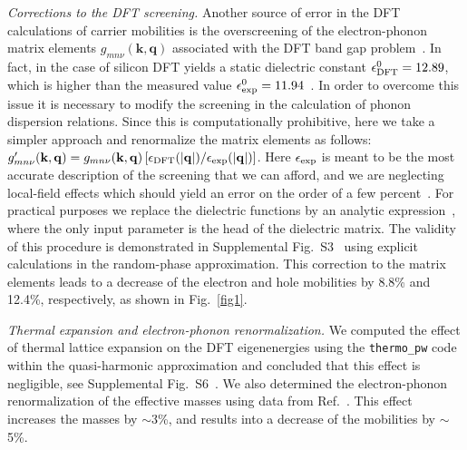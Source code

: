 \documentclass[aps,prl,twocolumn,superscriptaddress]{revtex4-1}
\begin{document}
{\it Corrections to the DFT screening.}
Another source of error in the DFT calculations of carrier mobilities is the overscreening of the
electron-phonon matrix elements $g_{mn\nu}(\mathbf{k,q})$ associated with the DFT band gap problem~\cite{Giustino2017}.
In fact, in the case of silicon DFT yields a static dielectric 
constant $\epsilon_{\rm DFT}^0 = 12.89$, which is higher than the measured value 
$\epsilon_{\rm exp}^0 = 11.94$~\cite{Sze2007}. In order to overcome this issue it is 
necessary to modify the screening in the calculation of phonon dispersion relations. Since this is 
computationally prohibitive, here we take a simpler approach and renormalize the matrix 
elements as follows: $g^\prime_{mn\nu}(\mathbf{k,q}) = g_{mn\nu}(\mathbf{k,q}) 
\left[\epsilon_{\rm DFT}(|{\bf q}|)/ \epsilon_{\rm exp}(|{\bf q}|)\right]$.
Here $\epsilon_{\rm exp}$ is meant to be the most accurate description of the screening that we can afford,
and we are neglecting local-field effects which should yield an error on the order of a few percent~\cite{Hybertsen1987}. 
For practical purposes we replace the 
dielectric functions by an analytic expression~\cite{Resta1977}, where the only input parameter is the head of
the dielectric matrix. The validity of this procedure
is demonstrated in Supplemental Fig.~S3~\cite{SI} using explicit
calculations in the random-phase approximation. This correction to the matrix elements leads
to a decrease of the electron and hole mobilities by 8.8\% and
12.4\%, respectively, as shown in Fig.~\ref{fig1}.

{\it Thermal expansion and electron-phonon renormalization.} We computed the effect of 
thermal lattice expansion on the DFT eigenenergies using the \texttt{thermo\_pw} code~\cite{thermopw} within the quasi-harmonic approximation 
and concluded that this effect is negligible, see Supplemental Fig.~S6~\cite{SI}.
We also determined the electron-phonon renormalization of the effective masses using data
from Ref.~. This effect increases the masses by $\sim$3\%, and results into
a decrease of the mobilities by $\sim$5\%. 
\end{document}
